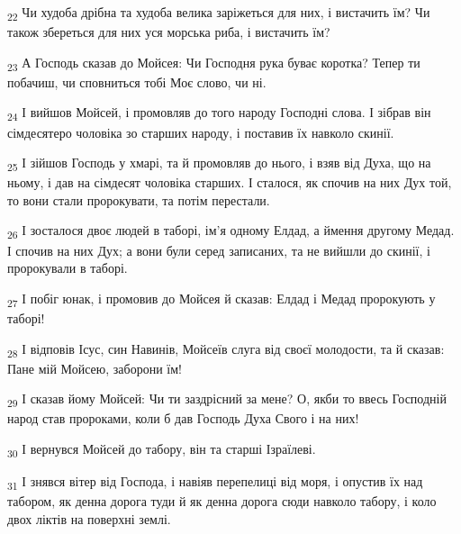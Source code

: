 \begin{tcolorbox}
\textsubscript{22} Чи худоба дрібна та худоба велика заріжеться для них, і вистачить їм? Чи також збереться для них уся морська риба, і вистачить їм?
\end{tcolorbox}
\begin{tcolorbox}
\textsubscript{23} А Господь сказав до Мойсея: Чи Господня рука буває коротка? Тепер ти побачиш, чи сповниться тобі Моє слово, чи ні.
\end{tcolorbox}
\begin{tcolorbox}
\textsubscript{24} І вийшов Мойсей, і промовляв до того народу Господні слова. І зібрав він сімдесятеро чоловіка зо старших народу, і поставив їх навколо скинії.
\end{tcolorbox}
\begin{tcolorbox}
\textsubscript{25} І зійшов Господь у хмарі, та й промовляв до нього, і взяв від Духа, що на ньому, і дав на сімдесят чоловіка старших. І сталося, як спочив на них Дух той, то вони стали пророкувати, та потім перестали.
\end{tcolorbox}
\begin{tcolorbox}
\textsubscript{26} І зосталося двоє людей в таборі, ім'я одному Елдад, а ймення другому Медад. І спочив на них Дух; а вони були серед записаних, та не вийшли до скинії, і пророкували в таборі.
\end{tcolorbox}
\begin{tcolorbox}
\textsubscript{27} І побіг юнак, і промовив до Мойсея й сказав: Елдад і Медад пророкують у таборі!
\end{tcolorbox}
\begin{tcolorbox}
\textsubscript{28} І відповів Ісус, син Навинів, Мойсеїв слуга від своєї молодости, та й сказав: Пане мій Мойсею, заборони їм!
\end{tcolorbox}
\begin{tcolorbox}
\textsubscript{29} І сказав йому Мойсей: Чи ти заздрісний за мене? О, якби то ввесь Господній народ став пророками, коли б дав Господь Духа Свого і на них!
\end{tcolorbox}
\begin{tcolorbox}
\textsubscript{30} І вернувся Мойсей до табору, він та старші Ізраїлеві.
\end{tcolorbox}
\begin{tcolorbox}
\textsubscript{31} І знявся вітер від Господа, і навіяв перепелиці від моря, і опустив їх над табором, як денна дорога туди й як денна дорога сюди навколо табору, і коло двох ліктів на поверхні землі.
\end{tcolorbox}
